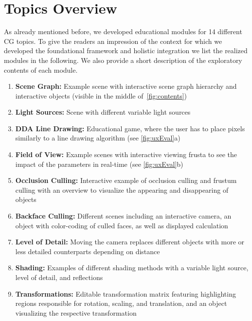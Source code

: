 \section{Topics Overview\label{sec:topics}}
As already mentioned before, we developed educational modules for 14 different CG topics. To give the readers an impression of the context for which we developed the foundational framework and holistic integration we list the realized modules in the following. We also provide a short description of the exploratory contents of each module.
\begin{enumerate}
	\vspace{-0.3cm}\item \textbf{Scene Graph:} Example scene with interactive scene graph hierarchy and interactive objects (visible in the middle of~\autoref{fig:contents})
	\vspace{-0.3cm}\item \textbf{Light Sources:} Scene with different variable light sources
	\vspace{-0.3cm}\item \textbf{DDA Line Drawing:} Educational game, where the user has to place pixels similarly to a line drawing algorithm (see \autoref{fig:uxEval}a)
	\vspace{-0.3cm}\item \textbf{Field of View:} Example scenes with interactive viewing frusta to see the impact of the parameters in real-time (see \autoref{fig:uxEval}b)
	\vspace{-0.3cm}\item \textbf{Occlusion Culling:} Interactive example of occlusion culling and frustum culling with an overview to visualize the appearing and disappearing of objects
	\vspace{-0.3cm}\item \textbf{Backface Culling:} Different scenes including an interactive camera, an object with color-coding of culled faces, as well as displayed calculation
	\vspace{-0.3cm}\item \textbf{Level of Detail:} Moving the camera replaces different objects with more or less detailed counterparts depending on distance
	\vspace{-0.3cm}\item \textbf{Shading:} Examples of different shading methods with a variable light source, level of detail, and reflections
	\vspace{-0.3cm}\item \textbf{Transformations:} Editable transformation matrix featuring highlighting regions responsible for  rotation, scaling, and translation, and an object visualizing the respective transformation

\end{enumerate}
